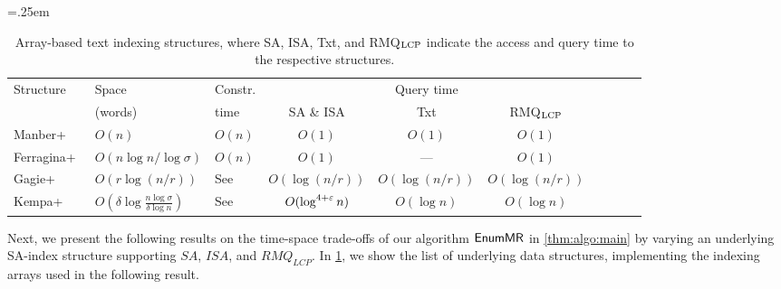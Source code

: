 \begin{table}[t]\centering\tabcolsep=.25em
\caption{%
  Array-based text indexing structures, where SA, ISA, Txt, and RMQ$_{\mathrm{LCP}}$ indicate the access and query time to the respective structures.
}\label{table:arrays:hybrid}
\medskip
\begin{tabular}{l>{\centering}p{7em}>{\centering}p{4em}cccclll}\toprule
  Structure  & Space & Constr. & \multicolumn{3}{c}{Query time}	\\
\cmidrule{4-6}
& (words) & time  & SA \& ISA	& Txt	& RMQ$_{\mathrm{LCP}}$
\\
  \midrule
Manber+~\cite{manber:myers1993suffixarrays}	& $O(n)$   & $O(n)$	& $O(1)$	& $O(1)$	& $O(1)$	\\
Ferragina+~\cite{Ferragina05:FM}  & $O(n\log n/\log\sigma)$	& $O(n)$  & $O(1)$	& ---	&
$O(1)$
\\
Gagie+~\cite{gagie:navarro:prezza2020fully}	& $O(r\log(n/r))$	& See~\cite{gagie:navarro:prezza2020fully}   & $O(\log(n/r))$	& $O(\log(n/r))$	& $O(\log(n/r))$	\\
Kempa+~\cite{kempa:kociumaka2023collapsing}	& $O(\delta \log\frac{n\log\sigma}{\delta\log n})$	& See~\cite{kempa:kociumaka2023collapsing}   & $O(\log^{4+\varepsilon} n)$	& $O(\log n)$	& $O(\log n)$	\\
\bottomrule
\end{tabular}
\end{table}

Next, we present the following results on the time-space trade-offs of our algorithm $\textsf{EnumMR}$ in \cref{thm:algo:main} by varying an underlying SA-index structure supporting $SA$, $ISA$, and $RMQ_{LCP}$.
In \cref{table:arrays:hybrid}, we show the list of underlying data structures, implementing the indexing arrays used in the following result. 



